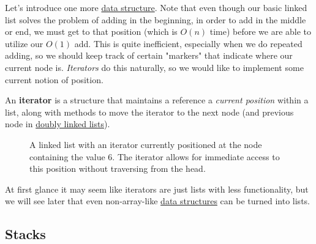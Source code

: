   Let's introduce one more \hyperref[def:data-structure]{data structure}. Note that even though our basic linked list solves the problem of adding in the beginning, in order to add in the middle or end, we must get to that position (which is $O(n)$ time) before we are able to utilize our $O(1)$ add. This is quite inefficient, especially when we do repeated adding, so we should keep track of certain "markers" that indicate where our current node is. \textit{Iterators} do this naturally, so we would like to implement some current notion of position. 

  \begin{definition}[Iterator]
    \label{def:iterator}
    An \textbf{iterator} is a structure that maintains a reference a \textit{current position} within a list, along with methods to move the iterator to the next node (and previous node in \hyperref[def:doubly-linked-list]{doubly linked lists}). 

    \begin{figure}[H]
      \centering 
      \caption{A linked list with an iterator currently positioned at the node containing the value 6. The iterator allows for immediate access to this position without traversing from the head.}
      \label{fig:linked_list_iterator}
    \end{figure}
  \end{definition}

  At first glance it may seem like iterators are just lists with less functionality, but we will see later that even non-array-like \hyperref[def:data-structure]{data structures} can be turned into lists.  

\subsection{Stacks} 

